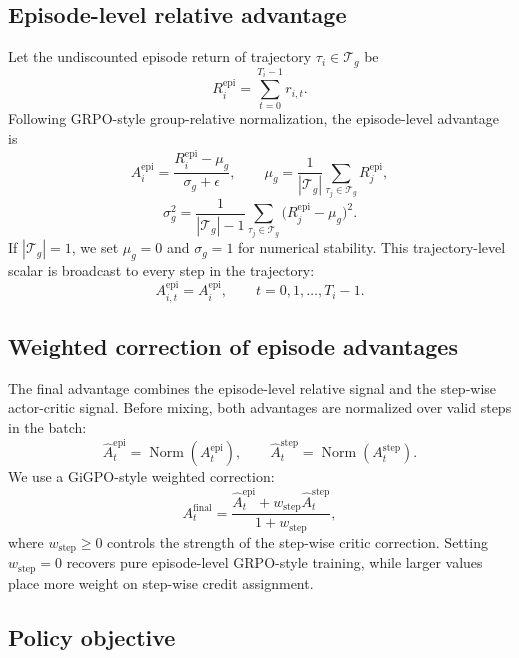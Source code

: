 \documentclass[10pt]{article}
\newcommand{\norm}{\operatorname{Norm}}
\begin{document}
\subsection*{Episode-level relative advantage}

Let the undiscounted episode return of trajectory $\tau_i\in\mathcal{T}_g$ be
\[
R_i^{\mathrm{epi}} = \sum_{t=0}^{T_i-1} r_{i,t}.
\]
Following GRPO-style group-relative normalization, the episode-level advantage is
\[
A_i^{\mathrm{epi}}
= \frac{R_i^{\mathrm{epi}} - \mu_g}{\sigma_g + \epsilon},
\qquad
\mu_g = \frac{1}{|\mathcal{T}_g|}\sum_{\tau_j\in\mathcal{T}_g} R_j^{\mathrm{epi}},
\]
\[
\sigma_g^2
= \frac{1}{|\mathcal{T}_g|-1}\sum_{\tau_j\in\mathcal{T}_g}
\bigl(R_j^{\mathrm{epi}}-\mu_g\bigr)^2.
\]
If $|\mathcal{T}_g|=1$, we set $\mu_g=0$ and $\sigma_g=1$ for numerical stability. This trajectory-level scalar is broadcast to every step in the trajectory:
\[
A^{\mathrm{epi}}_{i,t}=A_i^{\mathrm{epi}},
\qquad t=0,1,\ldots,T_i-1.
\]

\subsection*{Weighted correction of episode advantages}

The final advantage combines the episode-level relative signal and the step-wise actor-critic signal. Before mixing, both advantages are normalized over valid steps in the batch:
\[
\widehat{A}^{\mathrm{epi}}_t = \norm(A^{\mathrm{epi}}_t),
\qquad
\widehat{A}^{\mathrm{step}}_t = \norm(A^{\mathrm{step}}_t).
\]
We use a GiGPO-style weighted correction:
\[
A^{\mathrm{final}}_t
= \frac{\widehat{A}^{\mathrm{epi}}_t + w_{\mathrm{step}}\widehat{A}^{\mathrm{step}}_t}
       {1+w_{\mathrm{step}}},
\]
where $w_{\mathrm{step}}\ge0$ controls the strength of the step-wise critic correction. Setting $w_{\mathrm{step}}=0$ recovers pure episode-level GRPO-style training, while larger values place more weight on step-wise credit assignment.

\subsection*{Policy objective}
\end{document}
